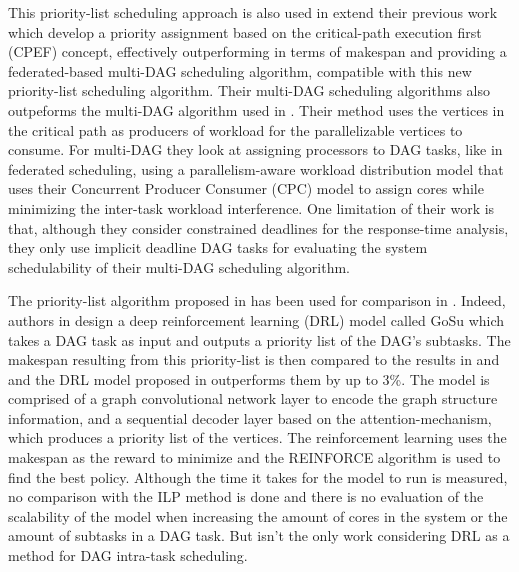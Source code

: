 This priority-list scheduling approach is also 
used in \cite{Zhao2022DAGsched} extend their previous work\cite{zhao2020DAGsched}
which develop a priority assignment based on 
the critical-path execution first (CPEF) concept,
effectively outperforming \cite{He2019DagIntra}
in terms of makespan and providing 
a federated-based multi-DAG scheduling algorithm,
compatible with this new priority-list scheduling algorithm.
Their multi-DAG scheduling algorithms also outpeforms 
the multi-DAG algorithm used in \cite{He2019DagIntra}.
Their method uses the vertices in the critical path 
as producers of workload for the parallelizable vertices
to consume.
For multi-DAG they look at assigning processors
to DAG tasks, like in federated scheduling, using 
a parallelism-aware workload distribution model
that uses their Concurrent Producer Consumer (CPC) model
to assign cores while minimizing the inter-task workload interference.
One limitation of their work is that,
although they consider constrained deadlines for the response-time
analysis, they only use implicit deadline DAG tasks 
for evaluating the system schedulability of their multi-DAG 
scheduling algorithm.

The priority-list algorithm proposed in \cite{Zhao2022DAGsched}
has been used for comparison in \cite{Lee2021GlobalDagSchedDRL}.
Indeed, authors in \cite{Lee2021GlobalDagSchedDRL}
design a deep reinforcement learning (DRL) model called GoSu 
which takes a DAG task as input and outputs 
a priority list of the DAG's subtasks.
The makespan resulting from this priority-list is 
then compared to the results in \cite{Zhao2022DAGsched} and \cite{He2019DagIntra}
and the DRL model proposed in \cite{Lee2021GlobalDagSchedDRL}
outperforms them by up to 3\%.
The model is comprised of a graph convolutional network 
layer to encode the graph structure information,
and a sequential decoder layer based on the attention-mechanism,
which produces a priority list of the vertices.
The reinforcement learning uses the makespan as the reward to minimize
and the REINFORCE algorithm is used to find the best policy.
Although the time it takes for the model to run is measured,
no comparison with the ILP method is done and 
there is no evaluation of the scalability of the model 
when increasing the amount of cores in the system or the amount of subtasks in a DAG task.
But \cite{Lee2021GlobalDagSchedDRL} isn't the only work considering 
DRL as a method for DAG intra-task scheduling.

